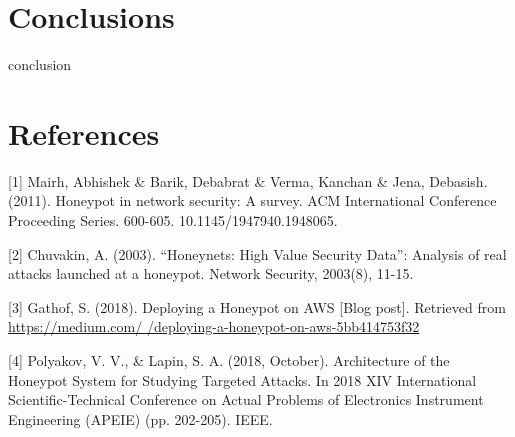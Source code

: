 \documentclass{sig-alternate}
\begin{document}
\section{Conclusions}
\label{sec:conclusion}
 {conclusion}

\section{References}


%
%
%
[1] Mairh, Abhishek \& Barik, Debabrat \& Verma, Kanchan \& Jena, Debasish. (2011). Honeypot in network security: A survey. ACM International Conference Proceeding Series. 600-605. 10.1145/1947940.1948065. \linebreak

[2] Chuvakin, A. (2003). “Honeynets: High Value Security Data”: Analysis of real attacks launched at a honeypot. Network Security, 2003(8), 11-15. \linebreak

[3] Gathof, S. (2018). Deploying a Honeypot on AWS [Blog post]. Retrieved from \href{https://medium.com/@sudojune/deploying-a-honeypot-on-aws-5bb414753f32}{https://medium.com/
	\linebreak@sudojune/deploying-a-honeypot-on-aws-5bb414753f32}\linebreak

[4] Polyakov, V. V., \& Lapin, S. A. (2018, October). Architecture of the Honeypot System for Studying Targeted Attacks. In 2018 XIV International Scientific-Technical Conference on Actual Problems of Electronics Instrument Engineering (APEIE) (pp. 202-205). IEEE.
\end{document}
